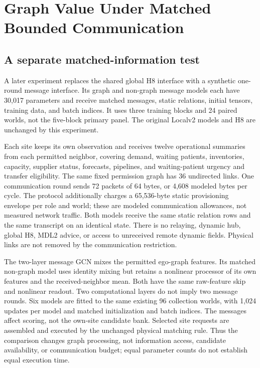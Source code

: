\documentclass[preprint,12pt]{elsarticle}
\begin{document}
\section{Graph Value Under Matched Bounded Communication}
\label{sec:exploratory}
\subsection{A separate matched-information test}
A later experiment replaces the shared global H8 interface with a synthetic
one-round message interface. Its graph and non-graph message models each have
30,017 parameters and receive matched messages, static relations, initial
tensors, training data, and batch indices. It uses three training blocks and
24 paired worlds, not the five-block primary panel. The original Localv2 models
and H8 are unchanged by this experiment.

Each site keeps its own observation and receives twelve operational summaries
from each permitted neighbor, covering demand, waiting patients, inventories,
capacity, supplier status, forecasts, pipelines, and waiting-patient urgency
and transfer eligibility. The same fixed permission graph has 36 undirected
links. One communication round sends 72 packets of 64 bytes, or 4,608 modeled
bytes per cycle. The protocol additionally charges a 65,536-byte static
provisioning envelope per role and world; these are modeled communication
allowances, not measured network traffic. Both models receive the same static relation rows and the same
transcript on an identical state. There is no relaying, dynamic hub, global H8,
MDL2 advice, or access to unreceived remote dynamic fields. Physical links are
not removed by the communication restriction.

The two-layer message GCN mixes the permitted ego-graph features. Its matched
non-graph model uses identity mixing but retains a nonlinear processor of its
own features and the received-neighbor mean. Both have the same raw-feature
skip and nonlinear readout. Two computational layers do not imply two message
rounds. Six models are fitted to the same existing 96 collection worlds,
with 1,024 updates per model and matched initialization and batch indices.
The messages affect scoring, not the own-site candidate bank. Selected site
requests are assembled and executed by the unchanged physical matching rule.
Thus the comparison changes graph processing, not information access, candidate
availability, or communication budget; equal parameter counts do not establish
equal execution time.
\end{document}

